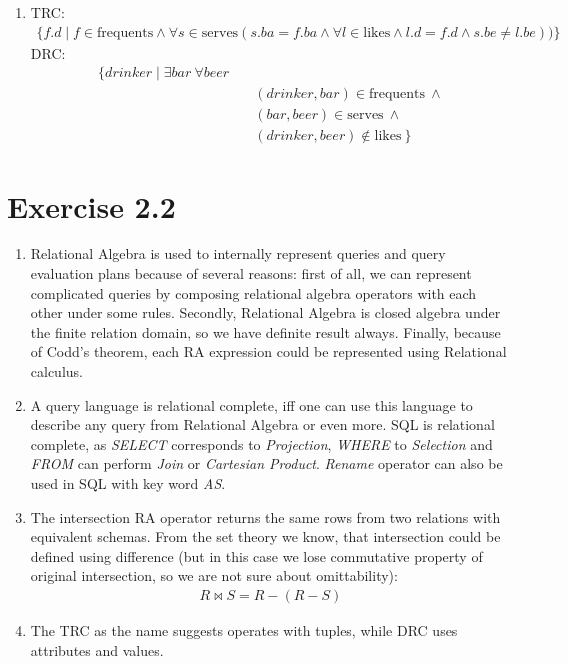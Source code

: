 \documentclass[10pt]{article}
\begin{document}
\begin{enumerate}[label=\arabic*.]
      \item
      TRC:
      \begin{equation*}
      \begin{split}
        \{f.d \mid f \in \text{frequents} \wedge \forall s \in \text{serves} (s.ba = f.ba \wedge \forall l \in \text{likes} \wedge l.d = f.d \wedge s.be \neq l.be))\}
      \end{split}
      \end{equation*}
      DRC:
      \begin{equation*}
      \begin{split}
      	\{drinker \mid \exists bar\ \forall beer \\
        &\quad (drinker, bar) \in \text{frequents}\ \wedge\\
        &\quad (bar, beer) \in \text{serves}\ \wedge\\
		&\quad (drinker, beer) \not\in \text{likes}\ \}
      \end{split}
      \end{equation*}
      
  \end{enumerate}

  \section*{Exercise 2.2}
  \begin{enumerate}[label=\arabic*.]
    \item
		Relational Algebra is used to internally represent queries and query evaluation
    plans because of several reasons: first of all, we can represent complicated queries
    by composing relational algebra operators with each other under some rules. Secondly,
    Relational Algebra is closed algebra under the finite relation domain, so we have
    definite result always. Finally, because of Codd's theorem, each RA expression
    could be represented using Relational calculus.
    \item
		A query language is relational complete, iff one can use this language to describe
    any query from Relational Algebra or even more. SQL is relational complete, as
    \textit{SELECT} corresponds to \textit{Projection}, \textit{WHERE} to \textit{Selection}
    and \textit{FROM} can perform \textit{Join} or \textit{Cartesian Product}. \textit{Rename}
    operator can also be used in SQL with key word \textit{AS}.
    \item
    The intersection RA operator returns the same rows from two relations with equivalent
    schemas. From the set theory we know, that intersection could be defined using
    difference (but in this case we lose commutative property of original intersection,
    so we are not sure about omittability):
    \begin{align}
      R \bowtie S = R - (R - S)
    \end{align}
    \item
  		The TRC as the name suggests operates with tuples, while DRC uses attributes and values.
  \end{enumerate}
\end{document}
